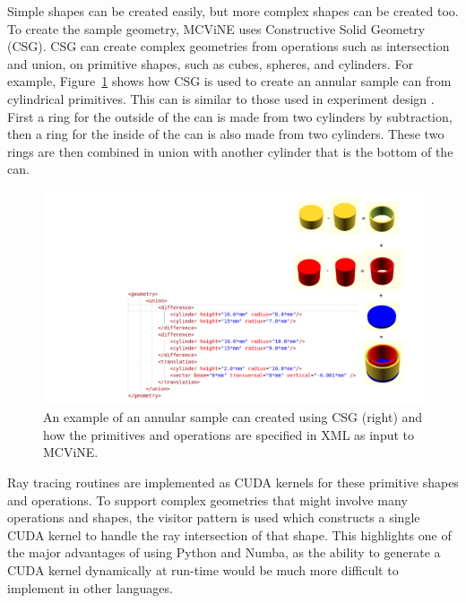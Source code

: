 \vspace{1mm}

\vspace{1mm}

Simple shapes can be created easily, but more complex shapes can be created too.
To create the sample geometry, MCViNE uses Constructive Solid Geometry (CSG). 
CSG can create complex geometries from operations such as intersection and union, on primitive shapes, such as cubes, spheres, and cylinders. 
For example, Figure~\ref{fig:csg} shows how CSG is used to create an annular sample can from cylindrical primitives. This can is similar to those used in experiment design \cite{PhysRevB.107.094511}.
First a ring for the outside of the can is made from two cylinders by subtraction, then a ring for the inside of the can is also made from two cylinders.  These two rings are then combined in union with another cylinder that is the bottom of the can. 

\begin{figure}[h]
    \centering
    \includegraphics[trim = {1.2cm 0 4cm 0 }, width=\columnwidth]{figures/mcvine_CSG_example.png}
    \caption{An example of an annular sample can  created using CSG (right) and how the primitives and operations are specified in XML as input to MCViNE.}
    \label{fig:csg}
\end{figure}

Ray tracing routines are implemented as CUDA kernels for these primitive shapes and operations. To support complex geometries that might involve many operations and shapes, the visitor pattern is used which constructs a single CUDA kernel to handle the ray intersection of that shape. This highlights one of the major advantages of using Python and Numba, as the ability to generate a CUDA kernel dynamically at run-time would be much more difficult to implement in other languages.

